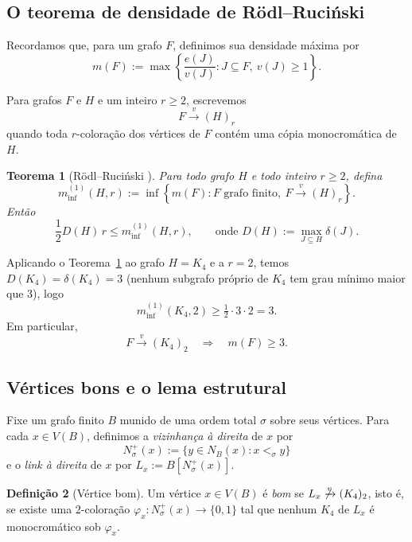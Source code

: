 \documentclass[reqno, 12pt]{amsart}
\numberwithin{equation}{section}
\theoremstyle{plain}
\newtheorem{theorem}{Teorema}[section]
\theoremstyle{definition}
\newtheorem{definition}[theorem]{Definição}
\begin{document}
\subsection{O teorema de densidade de Rödl--Ruciński}

Recordamos que, para um grafo $F$, definimos sua densidade máxima por
\[
  m(F)
  :=
  \max\left\{
  \frac{e(J)}{v(J)}
  :
  J\subseteq F,\ v(J)\geq 1
  \right\}.
\]

Para grafos $F$ e $H$ e um inteiro $r\geq 2$, escrevemos
\[
  F\xrightarrow{v}(H)_r
\]
quando toda $r$-coloração dos vértices de $F$ contém uma cópia
monocromática de $H$.

\begin{theorem}[Rödl--Ruciński {\cite[Theorem~5]{rodl1993lower}}]
  \label{thm:rr-vertex}
  Para todo grafo $H$ e todo inteiro $r\geq 2$, defina
  \[
    m_{\inf}^{(1)}(H,r)
    :=
    \inf\left\{
    m(F):
    F \text{ grafo finito},\ F\xrightarrow{v}(H)_r
    \right\}.
  \]
  Então
  \[
    \frac{1}{2}D(H)\,r
    \leq
    m_{\inf}^{(1)}(H,r),
    \qquad\text{onde } D(H):=\max_{J\subseteq H}\delta(J).
  \]
\end{theorem}

Aplicando o Teorema~\ref{thm:rr-vertex} ao grafo $H=K_4$ e a $r=2$,
temos $D(K_4)=\delta(K_4)=3$ (nenhum subgrafo próprio de $K_4$ tem
grau mínimo maior que $3$), logo
\[
  m_{\inf}^{(1)}(K_4,2)\geq \tfrac{1}{2}\cdot 3\cdot 2=3.
\]
Em particular,
\begin{equation}
  \label{eq:rr-k4}
  F\xrightarrow{v}(K_4)_2
  \quad\Longrightarrow\quad
  m(F)\geq 3.
\end{equation}

\subsection{Vértices bons e o lema estrutural}

Fixe um grafo finito $B$ munido de uma ordem total $\sigma$ sobre seus
vértices. Para cada $x\in V(B)$, definimos a \emph{vizinhança à
  direita} de $x$ por
\[
  N_\sigma^+(x):=\{y\in N_B(x): x<_\sigma y\}
\]
e o \emph{link à direita} de $x$ por $L_x:=B[N_\sigma^+(x)]$.

\begin{definition}[Vértice bom]
  \label{def:bom}
  Um vértice $x\in V(B)$ é \emph{bom} se $L_x\not\xrightarrow{v}(K_4)_2$,
  isto é, se existe uma $2$-coloração
  $\varphi_x:N_\sigma^+(x)\to\{0,1\}$ tal que nenhum $K_4$ de $L_x$ é
  monocromático sob $\varphi_x$.
\end{definition}
\end{document}
